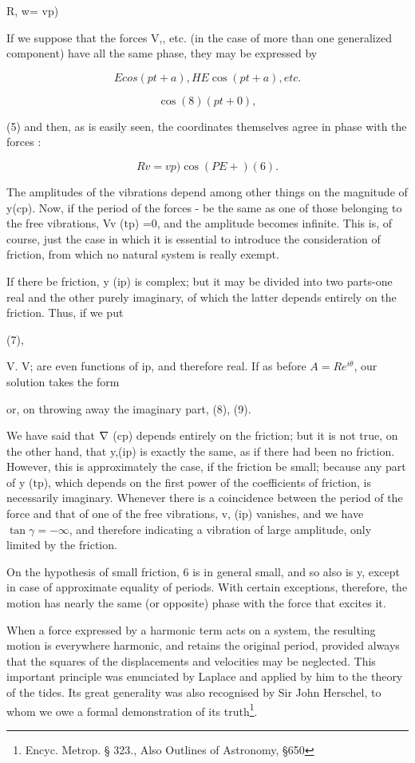 R, w= vp)

If we suppose that the forces V,, etc. (in the case of more than one
generalized component) have all the same phase, they may be expressed by

\[E cos(pt+a), HE \cos(pt+a), etc.\]

\[\cos(8)(pt +0),\]

(5) and then, as is easily seen, the coordinates themselves agree in phase with
the forces :

\[R v= vp) \cos(PE +)  (6).\]

The amplitudes of the vibrations depend among other things on the magnitude of
y(cp). Now, if the period of the forces - be the same as one of those belonging
to the free vibrations, Vv (tp) =0, and the amplitude becomes infinite. This
is, of course, just the case in which it is essential to introduce the
consideration of friction, from which no natural system is really exempt.

If there be friction, y (ip) is complex; but it may be divided into two
parts-one real and the other purely imaginary, of which the latter depends
entirely on the friction. Thus, if we put

(7),

V. V; are even functions of ip, and therefore real. If as before \(A = R e^{i
\theta}\), our solution takes the form

or, on throwing away the imaginary part, (8), (9).

We have said that \(\nabla\) (cp) depends entirely on the friction; but it is
not true, on the other hand, that y,(ip) is exactly the same, as if there had
been no friction. However, this is approximately the case, if the friction be
small; because any part of y (tp), which depends on the first power of the
coefficients of friction, is necessarily imaginary. Whenever there is a
coincidence between the period of the force and that of one of the free
vibrations, v, (ip) vanishes, and we have \(\tan \gamma = - \infty\), and
therefore indicating a vibration of large amplitude, only limited by the
friction.

On the hypothesis of small friction, 6 is in general small, and so also is y,
except in case of approximate equality of periods. With certain exceptions,
therefore, the motion has nearly the same (or opposite) phase with the force
that excites it.

When a force expressed by a harmonic term acts on a system, the resulting
motion is everywhere harmonic, and retains the original period, provided always
that the squares of the displacements and velocities may be neglected. This
important principle was enunciated by Laplace and applied by him to the theory
of the tides. Its great generality was also recognised by Sir John Herschel, to
whom we owe a formal demonstration of its truth\footnote{Encyc. Metrop. \S
323., Also Outlines of Astronomy, \S 650}.

